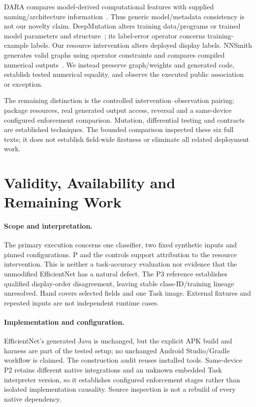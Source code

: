 \documentclass[10pt,conference]{IEEEtran}
\begin{document}
DARA compares model-derived computational features with supplied naming/architecture information~\cite{dara}. Thus generic model/metadata consistency is not our novelty claim. DeepMutation alters training data/programs or trained model parameters and structure~\cite{deepmutation}; its label-error operator concerns training-example labels. Our resource intervention alters deployed display labels. NNSmith generates valid graphs using operator constraints and compares compiled numerical outputs~\cite{nnsmith}. We instead preserve graph/weights and generated code, establish tested numerical equality, and observe the executed public association or exception.

The remaining distinction is the controlled intervention--observation pairing: package resources, real generated output access, reversal and a same-device configured enforcement comparison. Mutation, differential testing and contracts are established techniques. The bounded comparison inspected these six full texts; it does not establish field-wide firstness or eliminate all related deployment work.

\section{Validity, Availability and Remaining Work}
\label{sec:validity}
\paragraph{Scope and interpretation.}
The primary execution concerns one classifier, two fixed synthetic inputs and pinned configurations. P and the controls support attribution to the resource intervention. This is neither a task-accuracy evaluation nor evidence that the unmodified EfficientNet has a natural defect. The P3 reference establishes qualified display-order disagreement, leaving stable class-ID/training lineage unresolved. Hand covers selected fields and one Task image. External fixtures and repeated inputs are not independent runtime cases.

\paragraph{Implementation and configuration.}
EfficientNet's generated Java is unchanged, but the explicit APK build and harness are part of the tested setup; no unchanged Android Studio/Gradle workflow is claimed. The construction audit reuses installed tools. Same-device P2 retains different native integrations and an unknown embedded Task interpreter version, so it establishes configured enforcement stages rather than isolated implementation causality. Source inspection is not a rebuild of every native dependency.
\end{document}
